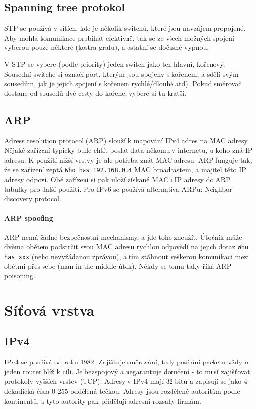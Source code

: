 \subsection{Spanning tree protokol}

STP se používá v sítích, kde je několik switchů, které jsou navzájem propojené. Aby mohla komunikace probíhat efektivně, tak se ze všech možných spojení vyberou pouze některé (kostra grafu), a ostatní se dočasně vypnou.

V STP se vybere (podle priority) jeden switch jako ten hlavní, kořenový. Sousední switche si označí port, kterým jsou spojeny s kořenem, a sdělí svým sousedům, jak je jejich spojení s kořenem rychlé/dlouhé atd). Pokud směrovač dostane od sousedů dvě cesty do kořene, vybere si tu kratší.

\subsection{ARP}

Adress resolution protocol (ARP) slouží k mapování IPv4 adres na MAC adresy. Nějaké zařízení typicky bude chtít poslat data někomu v internetu, u koho zná IP adresu. K použití nižší vrstvy je ale potřeba znát MAC adresu. ARP funguje tak, že se zařízení zeptá \texttt{Who has 192.168.0.4} MAC broadcastem, a majitel této IP adresy odpoví. Obě zařízení si pak uloží získané MAC i IP adresy do ARP tabulky pro další použití. Pro IPv6 se používá alternativa ARPu: Neighbor discovery protocol.

\paragraph{ARP spoofing} ARP nemá žádné bezpečnostní mechanismy, a jde toho zneužít. Útočník může dvěma obětem podstrčit svou MAC adresu rychlou odpovědí na jejich dotaz \texttt{Who has xxx} (nebo nevyžádanou zprávou), a tím stáhnout veškerou komunikaci mezi oběťmi přes sebe (man in the middle útok). Někdy se tomu taky říká ARP poisoning.



\section{Síťová vrstva}

\subsection{IPv4}
IPv4 se používá od roku 1982. Zajišťuje směrování, tedy posílání packetu vždy o jeden router blíž k cíli. Je bezspojový a negarantuje doručení - to musí zajišťovat protokoly vyšších vrstev (TCP). Adresy v IPv4 mají 32 bitů a zapisují se jako 4 dekadická čísla 0-255 oddělená tečkou. Adresy jsou rozdělené autoritám podle kontinentů, a tyto autority pak přidělují adresní rozsahy firmám.

